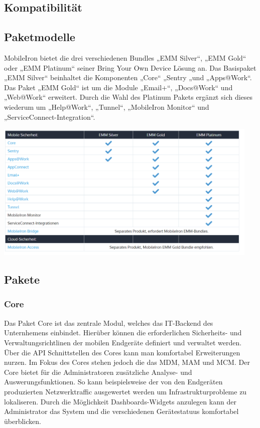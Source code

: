 \subsection {Kompatibilität}
\subsection {Paketmodelle}
MobileIron bietet die drei verschiedenen Bundles „EMM Silver“, „EMM Gold“ oder „EMM Platinum“ seiner Bring Your Own Device Lösung an.
Das Basispaket „EMM Silver“ beinhaltet die Komponenten „Core“ „Sentry „und „Apps@Work“. Das Paket „EMM Gold“ ist um die Module „Email+“, „Docs@Work“ und „Web@Work“ erweitert. Durch die Wahl des Platinum Pakets ergänzt sich dieses wiederum um „Help@Work“, „Tunnel“, „MobileIron Monitor“ und „ServiceConnect-Integration“.

\includegraphics[width=0.95\textwidth]{Bilder/mi_1.png} 

\subsection {Pakete}
\subsubsection {Core}
Das Paket Core ist das zentrale Modul, welches das IT-Backend des Unternhemens einbindet. Hierüber können die erforderlichen Sicherheits- und Verwaltungsrichtlinen der mobilen Endgeräte definiert und verwaltet werden. Über die  API Schnittstellen des Cores kann man komfortabel Erweiterungen nurzen. Im Fokus des Cores stehen jedoch die das MDM, MAM und MCM. Der Core bietet für die Administratoren zusätzliche Analyse- und Auswerungsfunktionen. So kann beispielsweise der von den Endgeräten produzierten Netzwerktraffic ausgewertet werden um Infrastrukturprobleme zu lokaliseren. Durch die Möglichkeit Dashboards-Widgets anzulegen kann der Administrator das System und die verschiedenen Gerätestatuus komfortabel überblicken. 
